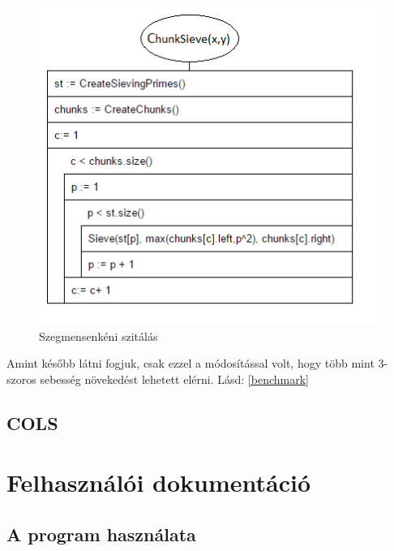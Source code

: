 \documentclass[twoside, a4paper, 12pt]{article}
\begin{document}
\begin{figure}[h]
\centering
\includegraphics{img/chunk_stuki.png}
\caption{Szegmensenkéni szitálás}
\end{figure}

Amint később látni fogjuk, csak ezzel a módosítással volt, hogy több mint 3-szoros sebesség növekedést lehetett elérni. Lásd: \ref{benchmark}
\subsection{COLS} \label{cols}

\clearpage
\section{Felhasználói dokumentáció}

\subsection{A program használata} \label{usage}
\end{document}

